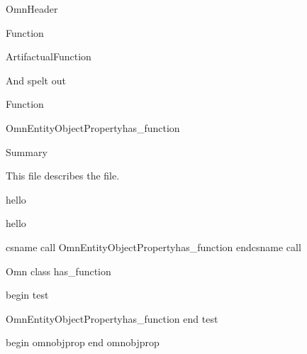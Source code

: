 \documentclass{article}
\begin{document}
OmnHeader
\OmnEntityHeaderheader

Function

\OmnEntityClassFunction

ArtifactualFunction

\OmnEntityClassArtifactualFunction


And spelt out

Function




\csname OmnEntityObjectPropertyhas_function\endcsname


Summary

\omnsummary

This file describes the \omndocfile{} file. 


\expandafter\def\csname Obi123\endcsname{hello}
\csname Obi123\endcsname

\expandafter\def\csname has_function\endcsname{hello}
\csname has_function\endcsname


csname call
\csname OmnEntityObjectPropertyhas_function\endcsname
endcsname call

Omn class has\_function

begin test
\newcommand{\test}[3]{\csname OmnEntity#1#2#3\endcsname}

\test{ObjectProperty}{}{has_function}
end test

begin omnobjprop
end omnobjprop

\end{document}
